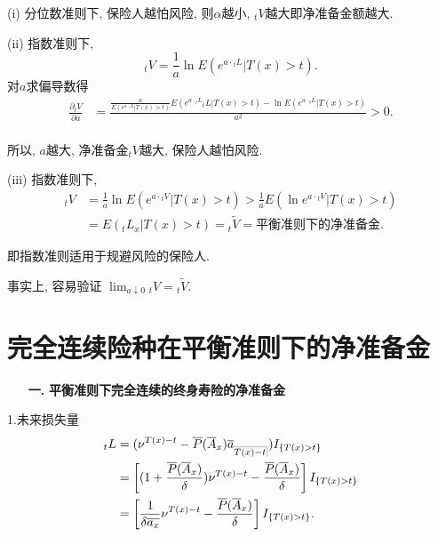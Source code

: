 \documentclass[a4paper,openany, 10pt]{ctexbook}
\makeatletter
\newcommand{\hei}{\CJKfamily{hei}}      %
\def\z{\left}
\def\y{\right}
\def\no{\nonumber}
\DeclareRobustCommand{\annu}[1]{_{%
    \def\arraystretch{0}%
    \setlength\arraycolsep{1pt}%
    \setlength\arrayrulewidth{.2pt}%
    \begin{array}[b]{@{}c|}\hline
        \\[\arraycolsep]%
        \scriptstyle #1%
    \end{array}%
}}
\makeatother
\begin{document}
\begin{remark}
  (i) 分位数准则下, 保险人越怕风险, 则$\alpha$越小, ${}_tV$越大即净准备金额越大.

(ii) 指数准则下, $${}_tV=\frac{1}{a}\ln E(e^{a\cdot{}_tL}|T(x)>t).$$
对$a$求偏导数得
\begin{align*}
    \frac{\partial {}_tV}{\partial a} &= \frac{\frac{a}{E(e^{a\cdot {}_tL}|T( x ) >t )}E( e^{a\cdot {}_tL}{}_tL|T( x ) >t )-\ln E( e^{a\cdot {}_tL}|T( x ) >t )}{a^2} >0. \\
\end{align*}

所以, $a$越大, 净准备金${}_tV$越大, 保险人越怕风险.

(iii) 指数准则下,
\begin{align*}
   {}_tV&=\frac{1}{a}\ln E(e^{a\cdot{}_tV}|T(x)>t)>\frac{1}{a}E(\ln e^{ a\cdot {}_tV}|T(x)>t)\no\\
   &=E(_tL_x|T(x)>t)={}_t\widetilde{V}=\text{平衡准则下的净准备金.}
\end{align*}

即指数准则适用于规避风险的保险人.

事实上, 容易验证 $\lim_{a\downarrow 0}{}_tV={}_t\widetilde{V}.$
\end{remark}

\section{完全连续险种在平衡准则下的净准备金}
\begin{itemize}
    \item[{\bf\hei 一.}]{\bf\hei 平衡准则下完全连续的终身寿险的净准备金}
\end{itemize}

1.未来损失量
\begin{align*}
    {}_tL&=(\nu^{T(x)-t}-\overline{P}( \overline{A}_x )\overline a_{\annu {T(x)-t}})I_{\{T(x)>t\}} \\
                        &=\z[(1+\frac{\overline{P}( \overline{A}_x )}{\delta})\nu^{T(x)-t}-\frac{\overline{P}( \overline{A}_x )}{\delta}\y] I_{\{T(x)>t\}}\\
                        &=\z[\frac{1}{\delta\overline{a_x}}\nu^{T(x)-t}-\frac{\overline{P}( \overline{A}_x )}{\delta}\y]I_{\{T(x)>t\}}.
\end{align*}
\end{document}
